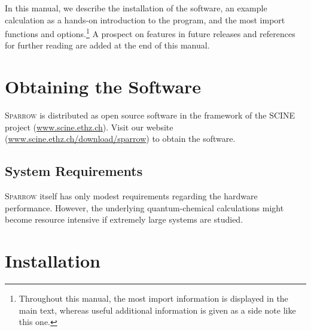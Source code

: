 \documentclass[]{tufte-book}
\begin{document}
In this manual, we describe the installation of the software, an example calculation as a hands-on 
introduction to the program, and the most import functions and options.\footnote{Throughout this manual, the most 
import information is displayed in the main text, whereas useful additional information is given as a side note like this one.}
A prospect on features in future releases and references for further reading are added at the end of this manual.\enlargethispage{\baselineskip}



\chapter{Obtaining the Software}
\label{ch:obtain}

\textsc{Sparrow}  is distributed as open source software in the framework of the SCINE project (\href{https://scine.ethz.ch/}{www.scine.ethz.ch}).
Visit our website (\href{https://scine.ethz.ch/download/sparrow}{www.scine.ethz.ch/download/sparrow}) to obtain the software. 

\section{System Requirements}

\textsc{Sparrow} itself has only modest requirements regarding the hardware performance. However, the underlying quantum-chemical 
calculations might become resource intensive if extremely large systems are studied.



\chapter[Installation]{Installation}
\label{ch:installation}
\end{document}

